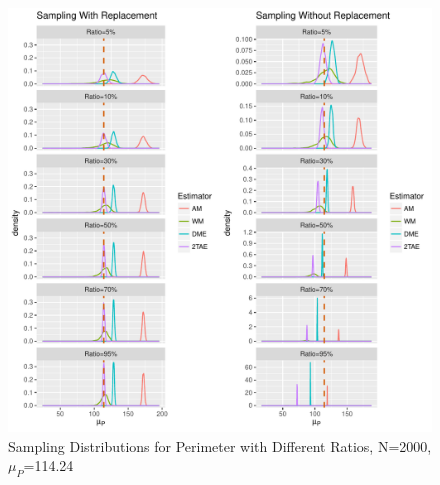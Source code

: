 \documentclass{article}\usepackage[]{graphicx}\usepackage[]{color}
\makeatletter
\def\maxwidth{ %
  \ifdim\Gin@nat@width>\linewidth
    \linewidth
  \else
    \Gin@nat@width
  \fi
}
\newenvironment{knitrout}{}{} %
\numberwithin{figure}{subsection} %
\numberwithin{table}{subsection} %
\makeatother
\begin{document}
  
\begin{figure}[!htbp]
\centering
\begin{knitrout}
\color{fgcolor}
\includegraphics[width=\maxwidth]{figure/unnamed-chunk-7-1} 

\end{knitrout}
  \caption{Sampling Distributions for Perimeter with Different Ratios, N=2000, ${\mu}_{P}$=114.24}  
\label{fig_dis_per}
\end{figure}
\end{document}

